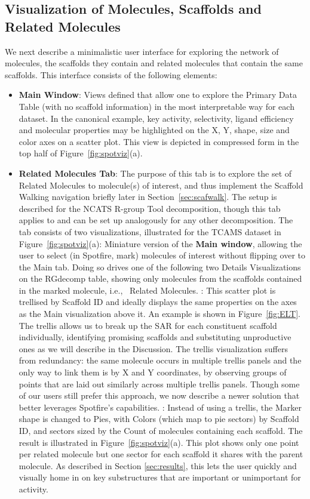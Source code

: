 \documentclass[journal=jacsat,biochem,manuscript=article]{achemso}
\newcommand*\fref[1]{Figure~\ref{fig:#1}}
\newcommand*\sref[1]{Section~\ref{sec:#1}}
\newcommand*\ie{i.e.,~}
\begin{document}
\subsection{Visualization of Molecules, Scaffolds and Related Molecules}

We next describe a minimalistic user interface for exploring the
network of molecules, the scaffolds they contain and related molecules
that contain the same scaffolds. This interface consists of the
following elements:
\begin{itemize}
\item {\bf Main Window}: Views defined that allow one to explore the
  Primary Data Table (with no scaffold information) in the most interpretable
  way for each dataset.  In the canonical example, key activity,
  selectivity, ligand efficiency and molecular properties may be
  highlighted on the X, Y, shape, size and color axes on a scatter  plot.
  This view is depicted in compressed form in the top half of \fref{spotviz}(a).
\item {\bf Related Molecules Tab}: The purpose of this tab is to explore the
  set of Related Molecules to molecule(s) of interest, and thus implement the Scaffold Walking navigation briefly later in \sref{scafwalk}.
  The setup is described for the NCATS R-group Tool decomposition,
  though this tab applies to and can be set up analogously for any
  other decomposition. The tab consists of two visualizations,
  illustrated for the TCAMS dataset in \fref{spotviz}(a):
  \subitem Miniature version of the {\bf Main window}, allowing the
  user to select (in Spotfire, mark) molecules of interest without
  flipping over to the Main tab. Doing so drives one of the following
  two Details Visualizations on the {RG}decomp table, showing only
  molecules from the scaffolds contained in the marked molecule, \ie
  Related Molecules.
  : This scatter
  plot is trellised by Scaffold ID and ideally displays the same
  properties on the axes as the Main visualization above it.  An
  example is shown in \fref{ELT}. The trellis allows us to break up
  the SAR for each constituent scaffold individually, identifying
  promising scaffolds and substituting unproductive ones as we will
  describe in the Discussion. The trellis visualization suffers from
  redundancy: the same molecule occurs in multiple trellis panels and
  the only way to link them is by X and Y coordinates, by observing
  groups of points that are laid out similarly across multiple trellis
  panels.  Though some of our users still prefer this approach, we now
  describe a newer solution that better leverages Spotfire's
  capabilities.
  : Instead of using a
  trellis, the Marker shape is changed to Pies, with Colors (which map
  to pie sectors) by Scaffold ID, and sectors sized by the Count of
  molecules containing each scaffold.  The result is illustrated in
  \fref{spotviz}(a). This plot shows only one point per related
  molecule but one sector for each scaffold it shares with the parent
  molecule.  As described in Section \ref{sec:results}, this lets the
  user quickly and visually home in on key substructures that are
  important or unimportant for activity.


\end{itemize}
\end{document}
